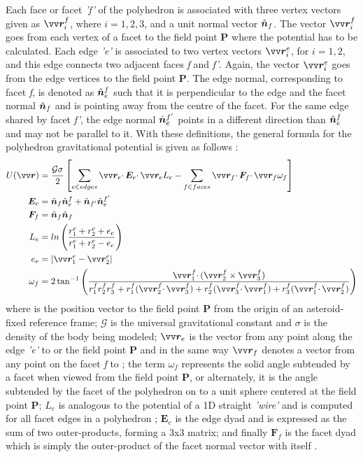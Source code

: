 \FloatBarrier
Each face or facet \textit{'f'} of the polyhedron is associated with three vertex vectors given as $\bvector{r}_i^f$, where $i=1,2,3$, and a unit normal vector $\hat{\bm{n}}_f$. The vector $\bv{r}_i^f$ goes from each vertex of a facet to the field point \textbf{P} where the potential has to be calculated. Each edge \textit{'e'} is associated to two vertex vectors $\bvector{r}_i^e$, for $i=1,2$, and this edge connects two adjacent faces \textit{f} and \textit{f'}. Again, the vector $\bv{r}_i^e$ goes from the edge vertices to the field point \textbf{P}. The edge normal, corresponding to facet \textit{f}, is denoted as $\hat{\bm{n}}_e^f$ such that it is perpendicular to the edge and the facet normal $\hat{\bm{n}}_f$ and is pointing away from the centre of the facet. For the same edge shared by facet \textit{f'}, the edge normal $\hat{\bm{n}}_e^{f'}$ points in a different direction than $\hat{\bm{n}}_e^f$ and may not be parallel to it. With these definitions, the general formula for the polyhedron gravitational potential is given as follows \parencite{scheeresBook}:
\begin{align}
    U(\bvector{r}) &= \frac{\mathcal{G}\sigma}{2} \left[ \sum_{e\in edges} \bvector{r}_e \cdotp \bm{E}_e \cdotp \bvector{r}_e L_e - \sum_{f\in faces} \bvector{r}_f \cdotp \bm{F}_f \cdotp \bvector{r}_f \omega_f \right]
    \label{eqn:polyhedron_potential} \\
    \bm{E}_e &= \buvec{n}_f \buvec{n}_e^f + \buvec{n}_{f'} \buvec{n}_e^{f'}
    \label{eqn:polyhedron_E_term} \\
    \bm{F}_f &= \buvec{n}_f \buvec{n}_f
    \label{eqn:polyhedron_F_term} \\
    L_e &= ln\left(\frac{r_1^e + r_2^e + e_e}{r_1^e + r_2^e - e_e} \right)
    \label{eqn:polyhedron_L_term} \\
    e_e &= |\bvector{r}_1^e - \bvector{r}_2^e|
    \label{eqn:polyhedron_e_term} \\
    \omega_f &= 2 \tan^{-1} \left(\frac{\bv{r}_1^f \cdotp (\bv{r}_2^f \times \bv{r}_3^f)}{r_1^f r_2^f r_3^f + r_1^f(\bv{r}_2^f \cdotp \bv{r}_3^f) + r_2^f(\bv{r}_3^f \cdotp \bv{r}_1^f) + r_3^f(\bv{r}_1^f \cdotp \bv{r}_2^f)} \right)
\end{align}
where  is the position vector to the field point \textbf{P} from the origin of an asteroid-fixed reference frame; $\mathcal{G}$ is the universal gravitational constant and $\sigma$ is the density of the body being modeled; $\bvector{r}_e$ is the vector from any point along the edge \textit{'e'} to  or the field point \textbf{P} and in the same way $\bvector{r}_f$ denotes a vector from any point on the facet \textit{f} to  \parencite{scheeresBook}; the term $\omega_f$ represents the solid angle subtended by a facet when viewed from the field point \textbf{P}, or alternately, it is the angle subtended by the facet of the polyhedron on to a unit sphere centered at the field point \textbf{P}; $L_e$ is analogous to the potential of a 1D straight \textit{'wire'} and is computed for all facet edges in a polyhedron \parencite{scheeres_polyhedra}; $\bm{E}_e$ is the edge dyad and is expressed as the sum of two outer-products, forming a 3x3 matrix; and finally $\bm{F}_f$ is the facet dyad which is simply the outer-product of the facet normal vector with itself \parencite{scheeres_polyhedra}.
